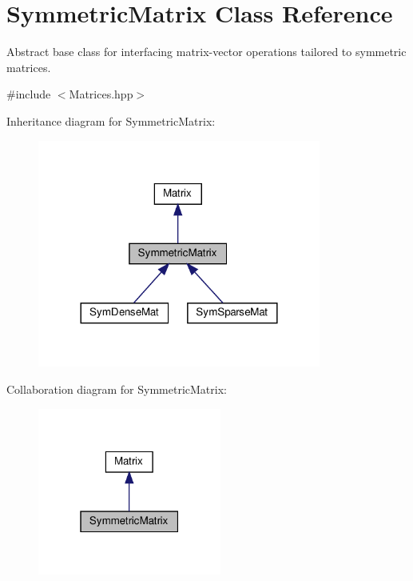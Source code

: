 \hypertarget{class_symmetric_matrix}{}\section{Symmetric\+Matrix Class Reference}
\label{class_symmetric_matrix}


Abstract base class for interfacing matrix-\/vector operations tailored to symmetric matrices.  




{\ttfamily \#include $<$Matrices.\+hpp$>$}



Inheritance diagram for Symmetric\+Matrix\+:
\nopagebreak
\begin{figure}[H]
\begin{center}
\leavevmode
\includegraphics[width=264pt]{class_symmetric_matrix__inherit__graph}
\end{center}
\end{figure}


Collaboration diagram for Symmetric\+Matrix\+:
\nopagebreak
\begin{figure}[H]
\begin{center}
\leavevmode
\includegraphics[width=171pt]{class_symmetric_matrix__coll__graph}
\end{center}
\end{figure}
